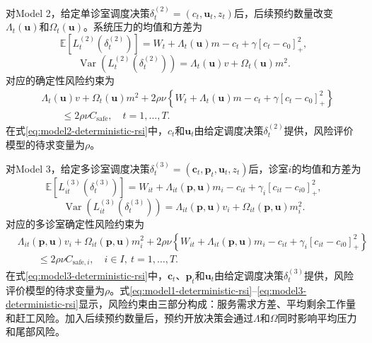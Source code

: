 \documentclass[a4paper,zihao=-4]{ctexart}
\newcommand{\E}{\mathbb{E}}
\newcommand{\Var}{\operatorname{Var}}
\numberwithin{figure}{section}
\numberwithin{table}{section}
\begin{document}
对Model 2，给定单诊室调度决策$\delta_t^{(2)}=(c_t,\bm u_t,z_t)$后，后续预约数量改变$\Lambda_t(\bm u)$和$\Omega_t(\bm u)$。系统压力的均值和方差为
\begin{equation}
\E[L_t^{(2)}(\delta_t^{(2)})]
=W_t+\Lambda_t(\bm u)m-c_t+\gamma[c_t-c_0]_+^2,
\end{equation}
\begin{equation}
\Var(L_t^{(2)}(\delta_t^{(2)}))
=\Lambda_t(\bm u)v+\Omega_t(\bm u)m^2.
\end{equation}
对应的确定性风险约束为
\begin{equation}
\begin{aligned}
&\Lambda_t(\bm u)v+\Omega_t(\bm u)m^2
+2\rho\nu\left\{W_t+\Lambda_t(\bm u)m-c_t+\gamma[c_t-c_0]_+^2\right\}\\
&\qquad\leq 2\rho\nu C_{\mathrm{safe}},
\quad t=1,\ldots,T.
\end{aligned}
\label{eq:model2-deterministic-rsi}
\end{equation}
在式\eqref{eq:model2-deterministic-rsi}中，$c_t$和$\bm u_t$由给定调度决策$\delta_t^{(2)}$提供，风险评价模型的待求变量为$\rho$。

对Model 3，给定多诊室调度决策$\delta_t^{(3)}=(\bm c_t,\bm p_t,\bm u_t,z_t)$后，诊室$i$的均值和方差为
\begin{equation}
\E[L_{it}^{(3)}(\delta_t^{(3)})]
=W_{it}+\Lambda_{it}(\bm p,\bm u)m_i-c_{it}+\gamma_i[c_{it}-c_{i0}]_+^2,
\end{equation}
\begin{equation}
\Var(L_{it}^{(3)}(\delta_t^{(3)}))
=\Lambda_{it}(\bm p,\bm u)v_i+\Omega_{it}(\bm p,\bm u)m_i^2.
\end{equation}
对应的多诊室确定性风险约束为
\begin{equation}
\begin{aligned}
&\Lambda_{it}(\bm p,\bm u)v_i+\Omega_{it}(\bm p,\bm u)m_i^2
 +2\rho\nu\left\{W_{it}+\Lambda_{it}(\bm p,\bm u)m_i-c_{it}
 +\gamma_i[c_{it}-c_{i0}]_+^2\right\}\\
&\qquad\leq 2\rho\nu C_{\mathrm{safe},i},
\quad i\in I,\ t=1,\ldots,T.
\end{aligned}
\label{eq:model3-deterministic-rsi}
\end{equation}
在式\eqref{eq:model3-deterministic-rsi}中，$\bm c_t$、$\bm p_t$和$\bm u_t$由给定调度决策$\delta_t^{(3)}$提供，风险评价模型的待求变量为$\rho$。式\eqref{eq:model1-deterministic-rsi}--\eqref{eq:model3-deterministic-rsi}显示，风险约束由三部分构成：服务需求方差、平均剩余工作量和赶工风险。加入后续预约数量后，预约开放决策会通过$\Lambda$和$\Omega$同时影响平均压力和尾部风险。
\end{document}
